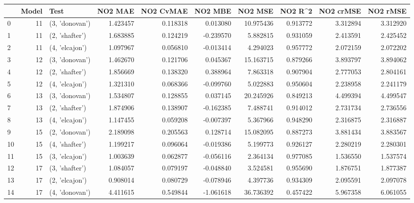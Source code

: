 \begin{tabular}{lrlrrrrrrr}
\toprule
{} &  Model &            Test &   NO2 MAE &  NO2 CvMAE &   NO2 MBE &    NO2 MSE &   NO2 R\textasciicircum2 &  NO2 crMSE &  NO2 rMSE \\
\midrule
0  &     11 &  (3, 'donovan') &  1.423457 &   0.118318 &  0.013080 &  10.975436 &  0.913772 &   3.312894 &  3.312920 \\
1  &     11 &  (2, 'shafter') &  1.683885 &   0.124219 & -0.239570 &   5.882815 &  0.931059 &   2.413591 &  2.425452 \\
2  &     11 &  (4, 'elcajon') &  1.097967 &   0.056810 & -0.013414 &   4.294023 &  0.957772 &   2.072159 &  2.072202 \\
3  &     12 &  (3, 'donovan') &  1.462670 &   0.121706 &  0.045367 &  15.163715 &  0.879266 &   3.893797 &  3.894062 \\
4  &     12 &  (2, 'shafter') &  1.856669 &   0.138320 &  0.388964 &   7.863318 &  0.907904 &   2.777053 &  2.804161 \\
5  &     12 &  (4, 'elcajon') &  1.321310 &   0.068366 & -0.099760 &   5.022883 &  0.950604 &   2.238958 &  2.241179 \\
6  &     13 &  (3, 'donovan') &  1.534807 &   0.128855 &  0.037145 &  20.245926 &  0.849213 &   4.499394 &  4.499547 \\
7  &     13 &  (2, 'shafter') &  1.874906 &   0.138907 & -0.162385 &   7.488741 &  0.914012 &   2.731734 &  2.736556 \\
8  &     13 &  (4, 'elcajon') &  1.147455 &   0.059208 & -0.007397 &   5.367966 &  0.948290 &   2.316875 &  2.316887 \\
9  &     15 &  (2, 'donovan') &  2.189098 &   0.205563 &  0.128714 &  15.082095 &  0.887273 &   3.881434 &  3.883567 \\
10 &     15 &  (4, 'shafter') &  1.199217 &   0.096064 & -0.019386 &   5.199773 &  0.926127 &   2.280219 &  2.280301 \\
11 &     15 &  (3, 'elcajon') &  1.003639 &   0.062877 & -0.056116 &   2.364134 &  0.977085 &   1.536550 &  1.537574 \\
12 &     17 &  (3, 'shafter') &  1.084057 &   0.079197 & -0.048840 &   3.524581 &  0.955690 &   1.876751 &  1.877387 \\
13 &     17 &  (2, 'elcajon') &  0.908014 &   0.080729 & -0.078946 &   4.397736 &  0.934309 &   2.095591 &  2.097078 \\
14 &     17 &  (4, 'donovan') &  4.411615 &   0.549844 & -1.061618 &  36.736392 &  0.457422 &   5.967358 &  6.061055 \\

\end{tabular}
